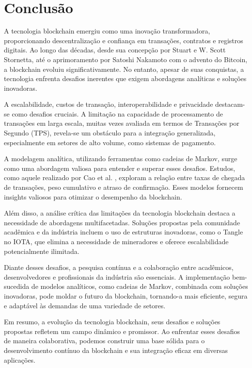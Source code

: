 \chapter{Conclusão}

\label{chapter_conclusao}

A tecnologia blockchain emergiu como uma inovação transformadora, proporcionando descentralização e confiança em transações, contratos e registros digitais. Ao longo das décadas, desde sua concepção por Stuart e W. Scott Stornetta, até o aprimoramento por Satoshi Nakamoto com o advento do Bitcoin, a blockchain evoluiu significativamente. No entanto, apesar de suas conquistas, a tecnologia enfrenta desafios inerentes que exigem abordagens analíticas e soluções inovadoras.

A escalabilidade, custos de transação, interoperabilidade e privacidade destacam-se como desafios cruciais. A limitação na capacidade de processamento de transações em larga escala, muitas vezes avaliada em termos de Transações por Segundo (TPS), revela-se um obstáculo para a integração generalizada, especialmente em setores de alto volume, como sistemas de pagamento.

A modelagem analítica, utilizando ferramentas como cadeias de Markov, surge como uma abordagem valiosa para entender e superar esses desafios. Estudos, como aquele realizado por Cao et al. \cite{cao2019impact}, exploram a relação entre taxas de chegada de transações, peso cumulativo e atraso de confirmação. Esses modelos fornecem insights valiosos para otimizar o desempenho da blockchain.

Além disso, a análise crítica das limitações da tecnologia blockchain destaca a necessidade de abordagens multifacetadas. Soluções propostas pela comunidade acadêmica e da indústria incluem o uso de estruturas inovadoras, como o Tangle no IOTA, que elimina a necessidade de mineradores e oferece escalabilidade potencialmente ilimitada.

Diante desses desafios, a pesquisa contínua e a colaboração entre acadêmicos, desenvolvedores e profissionais da indústria são essenciais. A implementação bem-sucedida de modelos analíticos, como cadeias de Markov, combinada com soluções inovadoras, pode moldar o futuro da blockchain, tornando-a mais eficiente, segura e adaptável às demandas de uma variedade de setores.

Em resumo, a evolução da tecnologia blockchain, seus desafios e soluções propostas refletem um campo dinâmico e promissor. Ao enfrentar esses desafios de maneira colaborativa, podemos construir uma base sólida para o desenvolvimento contínuo da blockchain e sua integração eficaz em diversas aplicações.

